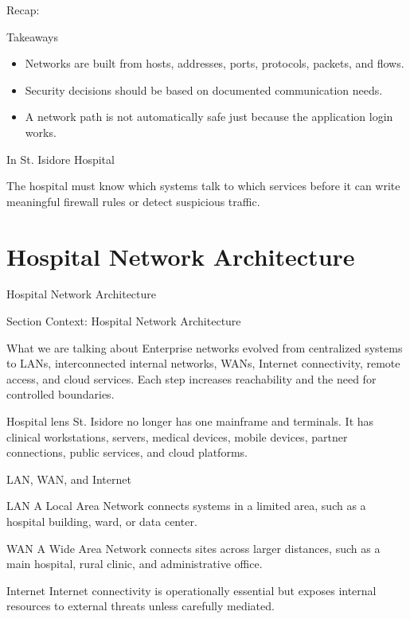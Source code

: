 \documentclass[presentation]{beamer}
\newcommand{\sectiontitleframe}[1]{
\begin{frame}[plain,c]
\begin{center}
{\usebeamerfont{title}\usebeamercolor[fg]{title}#1}
\end{center}
\end{frame}
}
\newcommand{\scenario}{St. Isidore Hospital}
\newcommand{\takeawaysframe}[2]{
\begin{frame}[c]{Recap: \insertsection}
\begin{block}{Takeaways}
#1
\end{block}
\begin{exampleblock}{In \scenario}
#2
\end{exampleblock}
\end{frame}
}
\begin{document}
\takeawaysframe{
\begin{itemize}
    \item Networks are built from hosts, addresses, ports, protocols, packets, and flows.
    \item Security decisions should be based on documented communication needs.
    \item A network path is not automatically safe just because the application login works.
\end{itemize}
}{
The hospital must know which systems talk to which services before it can write meaningful firewall
rules or detect suspicious traffic.
}

\section{Hospital Network Architecture}
\sectiontitleframe{Hospital Network Architecture}

\begin{frame}[c]{Section Context: Hospital Network Architecture}
\begin{block}{What we are talking about}
Enterprise networks evolved from centralized systems to LANs, interconnected internal networks, WANs,
Internet connectivity, remote access, and cloud services. Each step increases reachability and the
need for controlled boundaries.
\end{block}

\begin{exampleblock}{Hospital lens}
St. Isidore no longer has one mainframe and terminals. It has clinical workstations, servers,
medical devices, mobile devices, partner connections, public services, and cloud platforms.
\end{exampleblock}
\end{frame}

\begin{frame}[c]{LAN, WAN, and Internet}
\begin{block}{LAN}
A Local Area Network connects systems in a limited area, such as a hospital building, ward, or data
center.
\end{block}

\begin{block}{WAN}
A Wide Area Network connects sites across larger distances, such as a main hospital, rural clinic,
and administrative office.
\end{block}

\begin{block}{Internet}
Internet connectivity is operationally essential but exposes internal resources to external threats
unless carefully mediated.
\end{block}
\end{frame}
\end{document}
